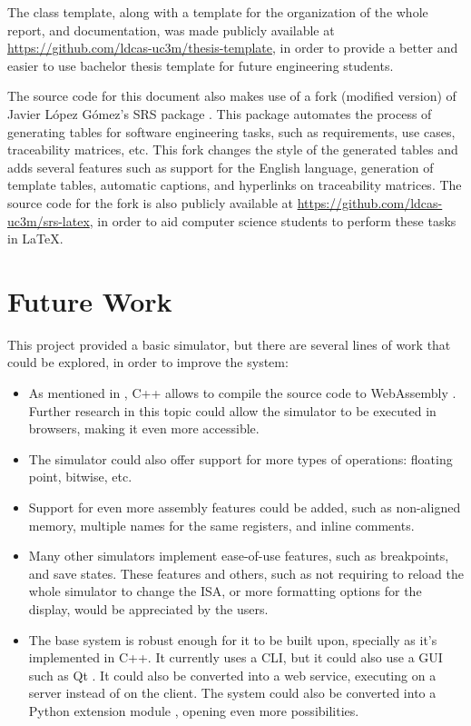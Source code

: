 The class template, along with a template for the organization of the whole report, and documentation, was made publicly available at \url{https://github.com/ldcas-uc3m/thesis-template}, in order to provide a better and easier to use bachelor thesis template for future engineering students.

The source code for this document also makes use of a fork (modified version) of Javier López Gómez's SRS package \parencite{SRSpackage}. This package automates the process of generating tables for \gls{software engineering} tasks, such as requirements, use cases, traceability matrices, etc. This fork changes the style of the generated tables and adds several features such as support for the English language, generation of template tables, automatic captions, and hyperlinks on traceability matrices. The source code for the fork is also publicly available at \url{https://github.com/ldcas-uc3m/srs-latex}, in order to aid computer science students to perform these tasks in \LaTeX.



\section{Future Work}\label{sec:future-work}
This project provided a basic simulator, but there are several lines of work that could be explored, in order to improve the system:
\begin{itemize}
  \item As mentioned in , C++ allows to compile the source code to WebAssembly \parencite{HaasAndreas2017Btwu}. Further research in this topic could allow the simulator to be executed in browsers, making it even more accessible.
  \item The simulator could also offer support for more types of operations: floating point, bitwise, etc.
  \item Support for even more \gls{assembly} features could be added, such as non-aligned memory, multiple names for the same registers, and inline comments.
  \item Many other simulators implement ease-of-use features, such as breakpoints, and save states. These features and others, such as not requiring to reload the whole simulator to change the \gls{ISA}, or more formatting options for the display, would be appreciated by the users.
  \item The base system is robust enough for it to be built upon, specially as it's implemented in C++. It currently uses a \gls{CLI}, but it could also use a \gls{GUI} such as Qt \parencite{QtFramework}. It could also be converted into a \gls{web service}, executing on a server instead of on the client. The system could also be converted into a Python extension module \parencite{pythonExtension}, opening even more possibilities.
\end{itemize}

